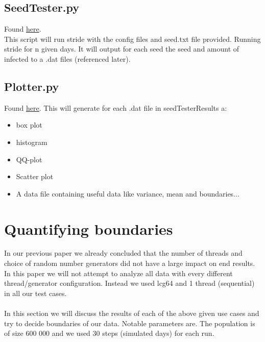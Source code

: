 \documentclass[a4paper]{article}
\begin{document}
\subsection{SeedTester.py}
Found \href{https://github.com/RobbeHeirman/Configs/blob/master/Scripts/seedTester.py}{here}.\\
This script will run stride with the config files and seed.txt file provided. Running stride for n given days. It will output for each seed the seed and amount of infected to a .dat files (referenced later).

\subsection{Plotter.py}
Found \href{https://github.com/RobbeHeirman/Configs/blob/master/Scripts/plotter.py}{here}.
This will generate for each .dat file in seedTesterResults a:
\begin{itemize}
\item box plot
\item histogram
\item QQ-plot
\item Scatter plot
\item A data file containing useful data like variance, mean and boundaries...
\end{itemize}

\section{Quantifying boundaries}
In our previous paper we already concluded that the number of threads and choice of random number generators did not have a large impact on end results. In this paper we will not attempt to analyze all data with every different thread/generator configuration. Instead we used lcg64 and 1 thread (sequential) in all our test cases.
\\
\\
In this section we will discuss the results of each of the above given use cases and try to decide boundaries of our data. Notable parameters are. The population is of size 600 000 and we used 30 steps (simulated days) for each run.
\end{document}
